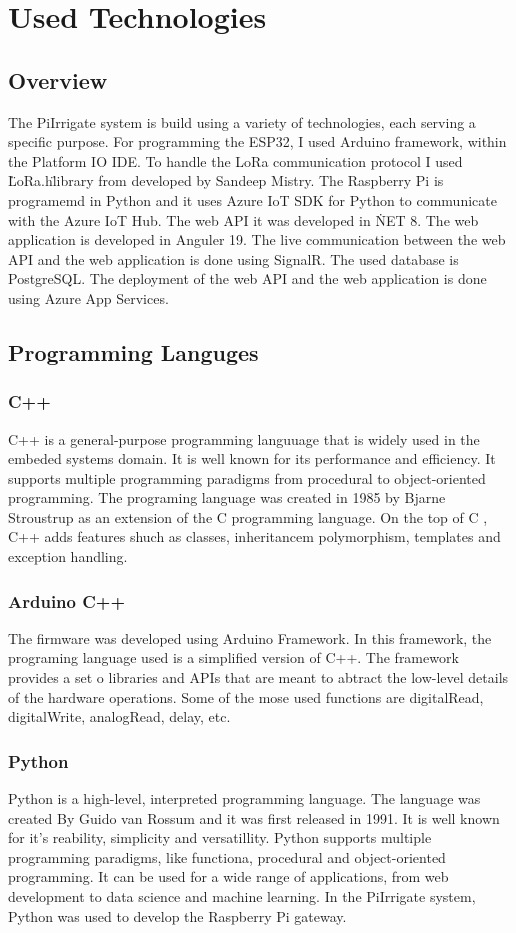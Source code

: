 \section{Used Technologies}
\subsection{Overview}
The PiIrrigate system is build using a variety of technologies, each serving a specific purpose. For programming
the ESP32, I used Arduino framework, within the Platform IO IDE. To handle the LoRa communication protocol I used \"LoRa.h\" library from developed by
Sandeep Mistry. The Raspberry Pi is programemd in Python
and it uses Azure IoT SDK for Python to communicate with the Azure IoT Hub. 
The web API it was developed in \.NET 8. The web application is developed in Anguler 19. The live communication between 
the web API and the web application is done using SignalR. The used database is PostgreSQL. The deployment of the web API and the web application
is done using Azure App Services.

\subsection{Programming Languges}
\subsubsection{C++}
C++ is a general-purpose programming languuage that is widely used in the embeded systems domain. It is well known
for its performance and efficiency. It supports multiple programming paradigms from procedural to object-oriented programming. 
The programing language was created in 1985 by Bjarne Stroustrup as an extension of the C programming language. On the top of C
, C++ adds features shuch as classes, inheritancem polymorphism, templates and exception handling.

\subsubsection {Arduino C++}
The firmware was developed using Arduino Framework. In this framework, the programing language used is a simplified version of C++.
The framework provides a set o libraries and APIs that are meant to abtract the low-level details of the hardware operations. Some of the
mose used functions are digitalRead, digitalWrite, analogRead, delay, etc.

\subsubsection{Python}
Python is a high-level, interpreted programming language. The language was created By Guido van Rossum and it was first released in 1991.
It is well known for it's reability, simplicity and versatillity. Python supports multiple programming paradigms, like functiona, procedural and
object-oriented programming. It can be used for a wide range of applications, from web development to data science and machine learning.
In the PiIrrigate system, Python was used to develop the Raspberry Pi gateway. 

